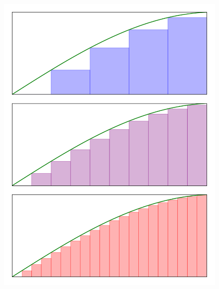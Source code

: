 \begin{figure}[H]
\centering
\begin{minipage}{.5\textwidth}
  \centering
  \includegraphics{Code/Area1.png}
  \label{fig:areabelow}
\end{minipage}%
\begin{minipage}{.5\textwidth}
  \centering

\end{minipage}
\end{figure}
